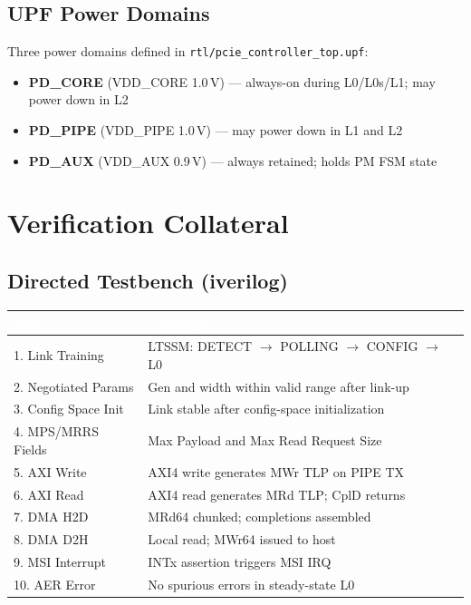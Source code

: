 \documentclass[11pt,a4paper]{article}
\newcommand{\theadcell}[1]{%
  \cellcolor{tablehead}\textcolor{white}{\textbf{#1}}}
\begin{document}
\subsection{UPF Power Domains}

Three power domains defined in \texttt{rtl/pcie\_controller\_top.upf}:

\begin{itemize}[noitemsep]
  \item \textbf{PD\_CORE} (VDD\_CORE 1.0\,V) --- always-on during L0/L0s/L1; may power down in L2
  \item \textbf{PD\_PIPE} (VDD\_PIPE 1.0\,V) --- may power down in L1 and L2
  \item \textbf{PD\_AUX}  (VDD\_AUX 0.9\,V) --- always retained; holds PM FSM state
\end{itemize}

\section{Verification Collateral}

\subsection{Directed Testbench (iverilog)}

\begin{tabular}{lp{10cm}}
  \toprule
  \theadcell{Test} & \theadcell{Coverage} \\
  \midrule
  1. Link Training    & LTSSM: DETECT $\to$ POLLING $\to$ CONFIG $\to$ L0 \\
  2. Negotiated Params & Gen and width within valid range after link-up \\
  3. Config Space Init & Link stable after config-space initialization \\
  4. MPS/MRRS Fields  & Max Payload and Max Read Request Size \\
  5. AXI Write        & AXI4 write generates MWr TLP on PIPE TX \\
  6. AXI Read         & AXI4 read generates MRd TLP; CplD returns \\
  7. DMA H2D          & MRd64 chunked; completions assembled \\
  8. DMA D2H          & Local read; MWr64 issued to host \\
  9. MSI Interrupt    & INTx assertion triggers MSI IRQ \\
  10. AER Error       & No spurious errors in steady-state L0 \\
  \bottomrule
\end{tabular}
\end{document}
